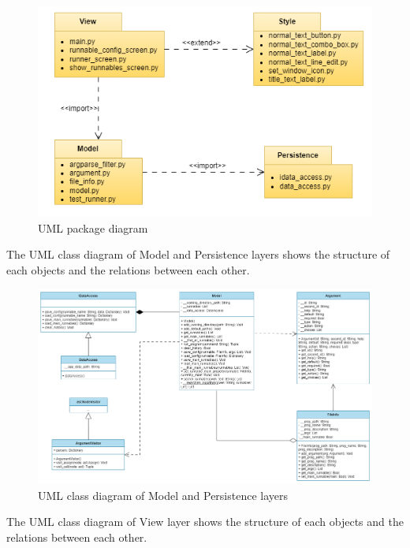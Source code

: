 \documentclass{article}
\begin{document}
\begin{figure}[h]
    \centering
    \includegraphics[width=1\linewidth]{img/package_diagram.drawio.png}
    \caption{UML package diagram}
    \label{fig:enter-label}
\end{figure}

The UML class diagram of Model and Persistence layers shows the structure of each objects and the relations between each other.

\begin{figure}[h]
    \centering
    \includegraphics[width=1\linewidth]{img/class_diagram_model_persistence.drawio.png}
    \caption{UML class diagram of Model and Persistence layers}
    \label{fig:enter-label}
\end{figure}

The UML class diagram of View layer shows the structure of each objects and the relations between each other.
\end{document}
